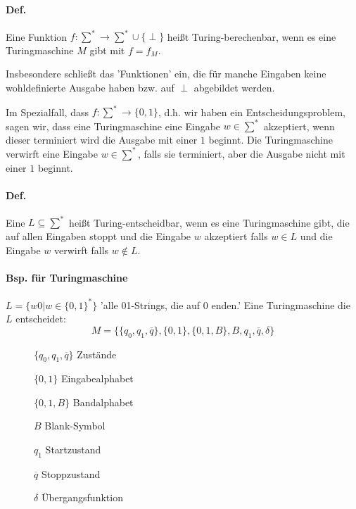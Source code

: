 \paragraph*{Def.} Eine Funktion $f:\sum^* \rightarrow\sum^* \cup \{ \perp \}$ heißt Turing-berechenbar, wenn es eine Turingmaschine $M$ gibt mit $f=f_M$.

\par\medskip
Insbesondere schließt das 'Funktionen' ein, die für manche Eingaben keine wohldefinierte Ausgabe haben bzw. auf $\perp$ abgebildet werden.\par\medskip

Im Spezialfall, dass $f:\sum^* \rightarrow \{ 0,1 \}$, d.h. wir haben ein Entscheidungsproblem, sagen wir, dass eine Turingmaschine eine Eingabe $w \in \sum^*$ akzeptiert, wenn dieser terminiert wird die Ausgabe mit einer $1$ beginnt. Die Turingmaschine verwirft eine Eingabe $w \in \sum^*$, falls sie terminiert, aber die Ausgabe nicht mit einer $1$ beginnt.\par\medskip

\paragraph*{Def.} Eine $L \subseteq \sum^*$ heißt Turing-entscheidbar, wenn es eine Turingmaschine gibt, die auf allen Eingaben stoppt und die Eingabe $w$ akzeptiert falls $w \in L$ und die Eingabe $w$ verwirft falls $w \not\in L$.

\paragraph*{Bsp. für Turingmaschine} $L=\{ w0|w \in \{ 0,1 \}^* \}$ 'alle 01-Strings, die auf 0 enden.' Eine Turingmaschine die $L$ entscheidet: $$ M=\{ \{q_0,q_1,\overline{q}\}, \{0,1\}, \{0,1,B\}, B, q_1, \overline{q}, \delta \} $$
\begin{description}
	\item[] $\{q_0,q_1,\overline{q}\}$ Zustände
	\item[] $\{0,1\}$ Eingabealphabet
	\item[] $\{0,1,B\}$ Bandalphabet
	\item[] $B$ Blank-Symbol
	\item[] $q_1$ Startzustand
	\item[] $\overline{q}$ Stoppzustand
	\item[] $\delta$ Übergangsfunktion
\end{description}

